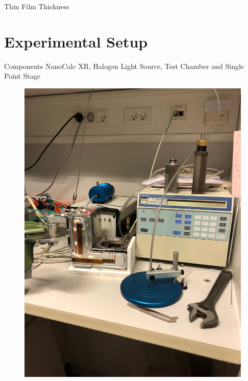 \documentclass[10pt]{beamer}
\begin{document}
\begin{frame}{Thin Film Thickness}
 
	\end{frame}
	
	\section{Experimental Setup}
	
	\begin{frame}{Components}
	NanoCalc XR, Halogen Light Source, Test Chamber and Single Point Stage
	
	\begin{minipage}{0.47\textwidth}
	\begin{figure}
	\includegraphics[scale=0.04,angle=-90]{setup1.JPG}
	\end{figure}
	\end{minipage}
	\begin{minipage}{0.5\textwidth}
	\begin{figure}

\end{figure}
\end{minipage}
\end{frame}
\end{document}

